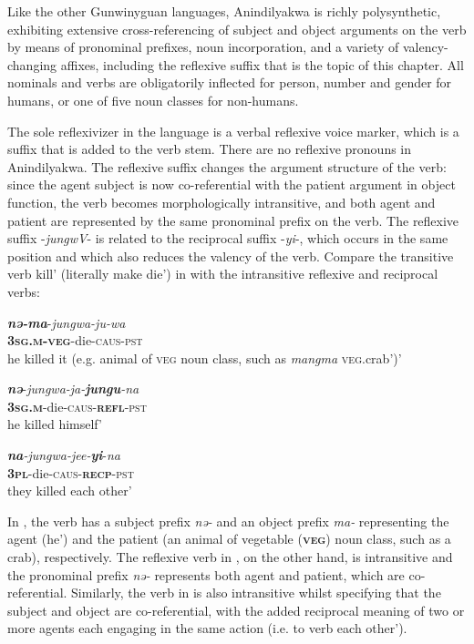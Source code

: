 \documentclass[output=paper]{langscibook}
\begin{document}
Like the other Gunwinyguan languages, Anindilyakwa is richly polysynthetic, exhibiting extensive cross-referencing of subject and object arguments on the verb by means of pronominal prefixes, noun incorporation, and a variety of valency-changing affixes, including the reflexive suffix that is the topic of this chapter. All nominals and verbs are obligatorily inflected for person, number and gender for humans, or one of five noun classes for non-humans.

The sole reflexivizer in the language is a verbal reflexive voice marker, which is a suffix that is added to the verb stem. There are no reflexive pronouns in Anindilyakwa. The reflexive suffix changes the argument structure of the verb: since the agent subject is now co-referential with the patient argument in object function, the verb becomes morphologically intransitive, and both agent and patient are represented by the same pronominal prefix on the verb. The reflexive suffix -\textit{jungwV}- is related to the reciprocal suffix -\textit{yi}-, which occurs in the same position and which also reduces the valency of the verb. Compare the transitive verb kill’ (literally make die’) in  with the intransitive reflexive  and reciprocal  verbs:



\ea%
 \label{ex:vanegmond:1}

 \ea
 \label{ex:vanegmond:1a}
\gll \textbf{\textit{nə-ma}}-\textit{jungwa-ju-wa}\\
\textbf{\textsc{3sg.m}}\textbf{-}\textbf{\textsc{veg}}-die-\textsc{caus}-\textsc{pst}\\
\glt he killed it (e.g. animal of \textsc{veg} noun class, such as \textit{mangma} \textsc{veg}.crab’)’


 \ex
 \label{ex:vanegmond:1b}
\gll \textbf{\textit{nə}}-\textit{jungwa-ja-}\textbf{\textit{jungu}}\textit{-na}\\
\textbf{\textsc{3sg.m}}-die-\textsc{caus}-\textbf{\textsc{refl}}-\textsc{pst}\\
\glt he killed himself’


 \ex
 \label{ex:vanegmond:1c}
\gll \textbf{\textit{na}}\textit{-jungwa-jee-}\textbf{\textit{yi}}-\textit{na}\\
\textbf{\textsc{3pl}}-die-\textsc{caus}-\textbf{\textsc{recp}}-\textsc{pst}\\
\glt they killed each other’
\z
\z



In , the verb has a subject prefix \textit{nə-} and an object prefix \textit{ma-} representing the agent (he’) and the patient (an animal of vegetable (\textbf{\textsc{veg}}) noun class, such as a crab), respectively. The reflexive verb in , on the other hand, is intransitive and the pronominal prefix \textit{nə-} represents both agent and patient, which are co-referential. Similarly, the verb in  is also intransitive whilst specifying that the subject and object are co-referential, with the added reciprocal meaning of two or more agents each engaging in the same action (i.e. to verb each other’).
\end{document}
